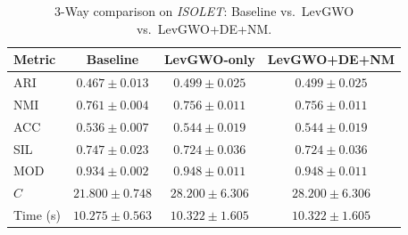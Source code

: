 \begin{table}[htbp]
\centering
\caption{3-Way comparison on \textit{ISOLET}: Baseline vs.\ LevGWO vs.\ LevGWO+DE+NM.}
\label{tab:isolet_3way}
\begin{tabular}{lccc}
\toprule
Metric & Baseline & LevGWO-only & LevGWO+DE+NM \\
\midrule
ARI & $0.467 \pm 0.013$ & $\mathbf{0.499 \pm 0.025}$ & $\mathbf{0.499 \pm 0.025}$ \\
NMI & $\mathbf{0.761 \pm 0.004}$ & $0.756 \pm 0.011$ & $0.756 \pm 0.011$ \\
ACC & $0.536 \pm 0.007$ & $\mathbf{0.544 \pm 0.019}$ & $\mathbf{0.544 \pm 0.019}$ \\
SIL & $\mathbf{0.747 \pm 0.023}$ & $0.724 \pm 0.036$ & $0.724 \pm 0.036$ \\
MOD & $0.934 \pm 0.002$ & $\mathbf{0.948 \pm 0.011}$ & $\mathbf{0.948 \pm 0.011}$ \\
$C$ & $21.800 \pm 0.748$ & $28.200 \pm 6.306$ & $28.200 \pm 6.306$ \\
Time (s) & $10.275 \pm 0.563$ & $10.322 \pm 1.605$ & $10.322 \pm 1.605$ \\
\bottomrule
\end{tabular}
\end{table}